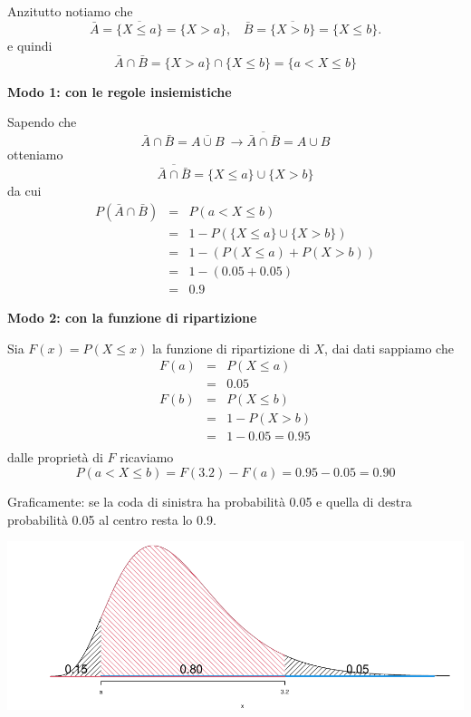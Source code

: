 \documentclass[
  11pt,
]{book}
\theoremstyle{mytheoremstyle}
\theoremstyle{mydefstyle}
\newenvironment{sol}
  {
  \begin{tcolorbox}[enhanced,breakable,arc=0.1mm,boxrule=1pt,colback=white,colframe=iblue,
  title=\bf \fontfamily{lmss}\selectfont \hspace{.5 cm} Soluzione,drop fuzzy shadow]

}{
\end{tcolorbox}
  }
\begin{document}
\begin{sol}

Anzitutto notiamo che
\[
\bar A=\overline{\{X\le  a\}} = \{X> a\},~~~~ \bar B=\overline{\{X>  b\}} = \{X\le b\}.
\]
e quindi
\[
\bar A\cap\bar B= \{X> a\}\cap\{X\le b\} =\{ a<X\le  b\}
\]

\textbf{Modo 1: con le regole insiemistiche}

Sapendo che
\[
{\bar A \cap \bar B} = \overline{A\cup B} ~\rightarrow \overline{\bar A \cap \bar B} = {A\cup B}
\]
otteniamo
\[
\overline{\bar A\cap\bar B}= \{X\le a\}\cup\{X> b\}
\]
da cui
\begin{eqnarray*}
P(\bar A\cap \bar B) &=& P( a < X \le  b) \\
                     &=& 1 - P(\{X\le  a\}\cup\{X >  b\})\\
                     &=& 1 - (P(X\le  a)+P(X >  b))\\
                     &=& 1 - (0.05 + 0.05)\\
                     &=& 0.9
\end{eqnarray*}

\textbf{Modo 2: con la funzione di ripartizione}

Sia \(F(x)=P(X\le x)\) la funzione di ripartizione di \(X\), dai dati sappiamo che
\begin{eqnarray*}
F( a)     &=& P(X\le  a)\\
           &=& 0.05\\
F( b) &=& P(X\le b)\\
       &=& 1-P(X>b)\\
       &=& 1- 0.05 = 0.95\\
\end{eqnarray*}
dalle proprietà di \(F\) ricaviamo
\[
P( a<X\le  b) = F(3.2)-F( a)=0.95-0.05=0.90
\]

Graficamente: se la coda di sinistra ha probabilità 0.05 e quella di destra probabilità 0.05 al centro resta lo 0.9.

\begin{center}\includegraphics{Esami_passati_con_soluzioni_files/figure-latex/unnamed-chunk-93-1} \end{center}

\end{sol}
\end{document}
